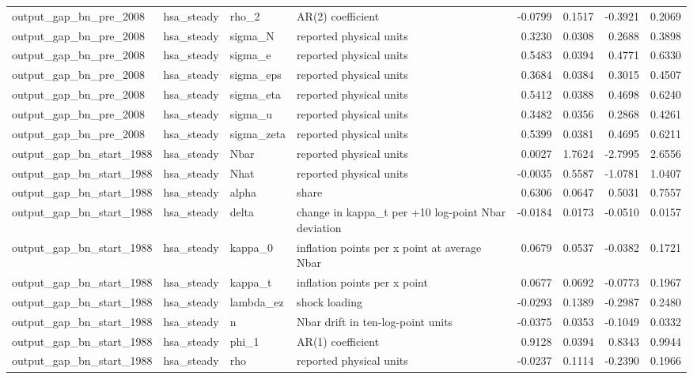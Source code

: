 \begin{tabular}{llllrrrr}
output\_gap\_bn\_pre\_2008 & hsa\_steady & rho\_2 & AR(2) coefficient & -0.0799 & 0.1517 & -0.3921 & 0.2069 \\
output\_gap\_bn\_pre\_2008 & hsa\_steady & sigma\_N & reported physical units & 0.3230 & 0.0308 & 0.2688 & 0.3898 \\
output\_gap\_bn\_pre\_2008 & hsa\_steady & sigma\_e & reported physical units & 0.5483 & 0.0394 & 0.4771 & 0.6330 \\
output\_gap\_bn\_pre\_2008 & hsa\_steady & sigma\_eps & reported physical units & 0.3684 & 0.0384 & 0.3015 & 0.4507 \\
output\_gap\_bn\_pre\_2008 & hsa\_steady & sigma\_eta & reported physical units & 0.5412 & 0.0388 & 0.4698 & 0.6240 \\
output\_gap\_bn\_pre\_2008 & hsa\_steady & sigma\_u & reported physical units & 0.3482 & 0.0356 & 0.2868 & 0.4261 \\
output\_gap\_bn\_pre\_2008 & hsa\_steady & sigma\_zeta & reported physical units & 0.5399 & 0.0381 & 0.4695 & 0.6211 \\
output\_gap\_bn\_start\_1988 & hsa\_steady & Nbar & reported physical units & 0.0027 & 1.7624 & -2.7995 & 2.6556 \\
output\_gap\_bn\_start\_1988 & hsa\_steady & Nhat & reported physical units & -0.0035 & 0.5587 & -1.0781 & 1.0407 \\
output\_gap\_bn\_start\_1988 & hsa\_steady & alpha & share & 0.6306 & 0.0647 & 0.5031 & 0.7557 \\
output\_gap\_bn\_start\_1988 & hsa\_steady & delta & change in kappa\_t per +10 log-point Nbar deviation & -0.0184 & 0.0173 & -0.0510 & 0.0157 \\
output\_gap\_bn\_start\_1988 & hsa\_steady & kappa\_0 & inflation points per x point at average Nbar & 0.0679 & 0.0537 & -0.0382 & 0.1721 \\
output\_gap\_bn\_start\_1988 & hsa\_steady & kappa\_t & inflation points per x point & 0.0677 & 0.0692 & -0.0773 & 0.1967 \\
output\_gap\_bn\_start\_1988 & hsa\_steady & lambda\_ez & shock loading & -0.0293 & 0.1389 & -0.2987 & 0.2480 \\
output\_gap\_bn\_start\_1988 & hsa\_steady & n & Nbar drift in ten-log-point units & -0.0375 & 0.0353 & -0.1049 & 0.0332 \\
output\_gap\_bn\_start\_1988 & hsa\_steady & phi\_1 & AR(1) coefficient & 0.9128 & 0.0394 & 0.8343 & 0.9944 \\
output\_gap\_bn\_start\_1988 & hsa\_steady & rho & reported physical units & -0.0237 & 0.1114 & -0.2390 & 0.1966 \\

\end{tabular}
